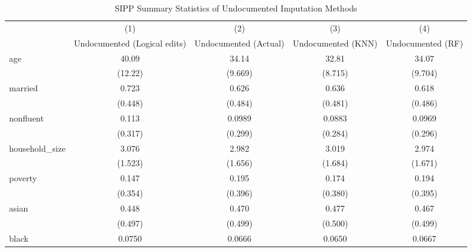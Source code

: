 \begin{table}[htbp]\centering
\def\sym#1{\ifmmode^{#1}\else\(^{#1}\)\fi}
\caption{SIPP Summary Statistics of Undocumented Imputation Methods \label{tab:sum}}
\begin{tabular}{l*{4}{c}}
\hline\hline
                    &\multicolumn{1}{c}{(1)}         &\multicolumn{1}{c}{(2)}         &\multicolumn{1}{c}{(3)}         &\multicolumn{1}{c}{(4)}         \\
                    &Undocumented (Logical edits)         &Undocumented (Actual)         &Undocumented (KNN)         &Undocumented (RF)         \\
\hline
age                 &       40.09         &       34.14         &       32.81         &       34.07         \\
                    &     (12.22)         &     (9.669)         &     (8.715)         &     (9.704)         \\
[1em]
married             &       0.723         &       0.626         &       0.636         &       0.618         \\
                    &     (0.448)         &     (0.484)         &     (0.481)         &     (0.486)         \\
[1em]
nonfluent           &       0.113         &      0.0989         &      0.0883         &      0.0969         \\
                    &     (0.317)         &     (0.299)         &     (0.284)         &     (0.296)         \\
[1em]
household\_size      &       3.076         &       2.982         &       3.019         &       2.974         \\
                    &     (1.523)         &     (1.656)         &     (1.684)         &     (1.671)         \\
[1em]
poverty             &       0.147         &       0.195         &       0.174         &       0.194         \\
                    &     (0.354)         &     (0.396)         &     (0.380)         &     (0.395)         \\
[1em]
asian               &       0.448         &       0.470         &       0.477         &       0.467         \\
                    &     (0.497)         &     (0.499)         &     (0.500)         &     (0.499)         \\
[1em]
black               &      0.0750         &      0.0666         &      0.0650         &      0.0667         \\

\end{tabular}
\end{table}
